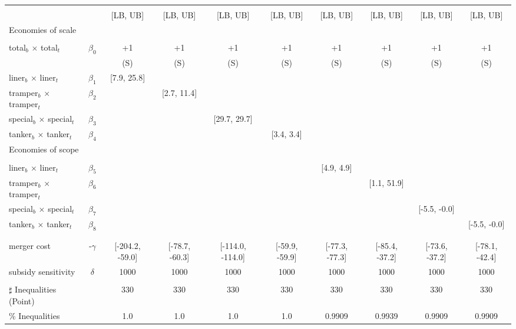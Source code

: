 \begin{tabular}{@{\extracolsep{5pt}}lccccccccc}
\toprule 
 &  &  &  &  &  &  &  &  &  \\
 &  & [LB, UB] & [LB, UB] & [LB, UB] & [LB, UB] & [LB, UB] & [LB, UB] & [LB, UB] & [LB, UB] \\
\midrule 
Economies of scale &  &  &  &  &  &  &  \\
 &  &  &  &  &  &  &  &  \\
total$_{b}$ $\times$ total$_{t}$ & $\beta_0$ & +1 & +1 & +1 & +1 & +1 & +1 & +1 & +1 \\
 &  & (S) & (S) & (S) & (S) & (S) & (S) & (S) & (S) \\
liner$_{b}$ $\times$ liner$_{t}$ & $\beta_1$ & [7.9, 25.8] &  &  &  &  &  &  &  \\
tramper$_{b}$ $\times$ tramper$_{t}$ & $\beta_2$ &  & [2.7, 11.4] &  &  &  &  &  &  \\
special$_{b}$ $\times$ special$_{t}$ & $\beta_3$ &  &  & [29.7, 29.7] &  &  &  &  &  \\
tanker$_{b}$ $\times$ tanker$_{t}$ & $\beta_4$ &  &  &  & [3.4, 3.4] &  &  &  &  \\
Economies of scope &  &  &  &  &  &  &  &  &  \\
 &  &  &  &  &  &  &  &  &  \\
liner$_{b}$ $\times$ liner$_{t}$ & $\beta_5$ &  &  &  &  & [4.9, 4.9] &  &  &  \\
tramper$_{b}$ $\times$ tramper$_{t}$ & $\beta_6$ &  &  &  &  &  & [1.1, 51.9] &  &  \\
special$_{b}$ $\times$ special$_{t}$ & $\beta_7$ &  &  &  &  &  &  & [-5.5, -0.0] &  \\
tanker$_{b}$ $\times$ tanker$_{t}$ & $\beta_8$ &  &  &  &  &  &  &  & [-5.5, -0.0] \\
 &  &  &  &  &  &  &  &  &  \\
 &  &  &  &  &  &  &  &  &  \\
merger cost & -$\gamma$ & [-204.2, -59.0] & [-78.7, -60.3] & [-114.0, -114.0] & [-59.9, -59.9] & [-77.3, -77.3] & [-85.4, -37.2] & [-73.6, -37.2] & [-78.1, -42.4] \\
subsidy sensitivity & $\delta$ & 1000 & 1000 & 1000 & 1000 & 1000 & 1000 & 1000 & 1000 \\
 &  &  &  &  &  &  &  &  &  \\
\hline 
$\sharp$ Inequalities (Point) &  & 330 & 330 & 330 & 330 & 330 & 330 & 330 & 330 \\
\% Inequalities &  & 1.0 & 1.0 & 1.0 & 1.0 & 0.9909 & 0.9939 & 0.9909 & 0.9909 \\
\bottomrule 
\end{tabular}

